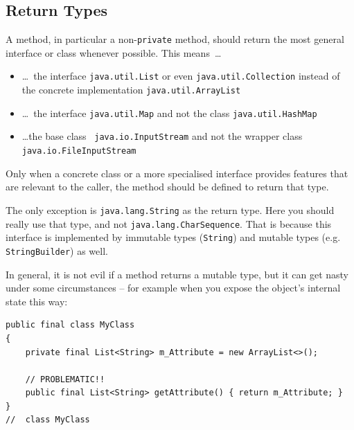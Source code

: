\documentclass[11pt,a4paper, titlepage, parskip=half, headsepline, footsepline, cleardoublepage=current, headheight=1cm]{scrbook}
\begin{document}
\subsection{Return Types}\label{sec:ReturnTypes}
A method, in particular a non-\lstinline|private| method, should return the most general interface or class whenever possible. This means~…
\begin{itemize}[nosep]
\item{…~the interface \lstinline|java.util.List|\autocite{ORACLE_DOC_LIST_INTERFACE} or even \lstinline|java.util.Collection|\autocite{ORACLE_DOC_COLLECTION_INTERFACE} instead of the concrete implementation \lstinline|java.util.ArrayList|\autocite{ORACLE_DOC_ARRAYLIST_CLASS}}
\item{…~the interface \lstinline|java.util.Map|\autocite{ORACLE_DOC_MAP_INTERFACE} and not the class \lstinline|java.util.HashMap|\autocite{ORACLE_DOC_HASHMAP_CLASS}}
\item{…the base class ~\lstinline|java.io.InputStream|\autocite{ORACLE_DOC_INPUTSTREAM_CLASS} and not the wrapper class \lstinline|java.io.FileInputStream|\autocite{ORACLE_DOC_FILEINPUTSTREAM_CLASS}}
\end{itemize}

Only when a concrete class or a more specialised interface provides features that are relevant to the caller, the method should be defined to return that type.

The only exception is \lstinline|java.lang.String| as the return type. Here you should really use that type, and not \lstinline|java.lang.CharSequence|. That is because this interface is implemented by immutable types (\lstinline|String|) and mutable types (e.g. \lstinline|StringBuilder|) as well.

In general, it is not evil if a method returns a mutable type, but it can get nasty under some circumstances – for example when you expose the object's internal state this way:
\begin{lstlisting}
public final class MyClass
{
    private final List<String> m_Attribute = new ArrayList<>();

    // PROBLEMATIC!!    
    public final List<String> getAttribute() { return m_Attribute; }
}
//  class MyClass    
\end{lstlisting}
\end{document}

